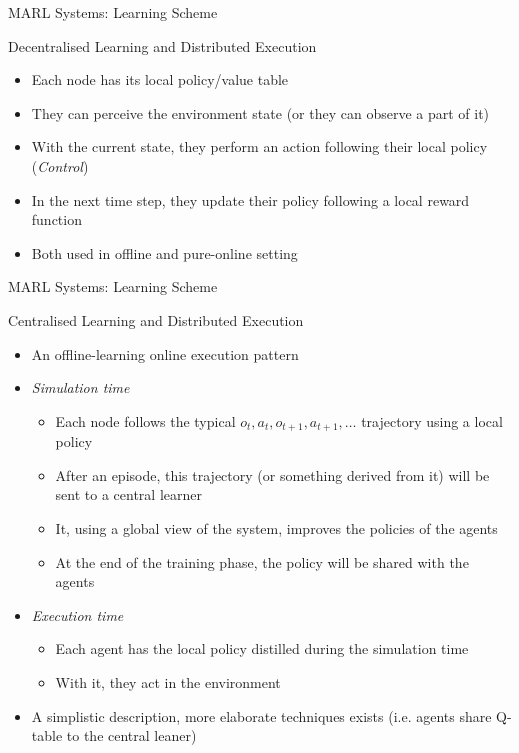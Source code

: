 \documentclass[presentation]{beamer}\mode<presentation>{\usetheme{AMSBolognaFC}}
\begin{document}
\begin{frame}{MARL Systems: Learning Scheme}
	
	\begin{exampleblock}{Decentralised Learning and Distributed Execution}
		\begin{itemize}
			\item Each node has its local policy/value table
			\item They can perceive the environment state (or they can observe a part of it)
			\item With the current state, they perform an action following their local policy (\emph{Control})
			\item In the next time step, they update their policy following a local reward function 
			\item Both used in offline and pure-online setting
		\end{itemize}
	\end{exampleblock}
\end{frame}
\begin{frame}{MARL Systems: Learning Scheme}
	
	\begin{exampleblock}{Centralised Learning and Distributed Execution}
		\begin{itemize}
			\item An offline-learning online execution pattern
			\item \emph{Simulation time}
			\begin{itemize}
				\item Each node follows the typical $o_t, a_t, o_{t+1}, a_{t+1},\dots $ trajectory using a local policy
				\item After an episode, this trajectory (or something derived from it) will be sent to a central learner
				\item It, using a global view of the system, improves the policies of the agents 
				\item At the end of the training phase, the policy will be shared with the agents
			\end{itemize} 
			\item \emph{Execution time}
				\begin{itemize}
					\item Each agent has the local policy distilled during the simulation time
					\item With it, they act in the environment
				\end{itemize}
			\item A simplistic description, more elaborate techniques exists (i.e. agents share Q-table to the central leaner)
		\end{itemize}
	\end{exampleblock}
\end{frame}
\end{document}
